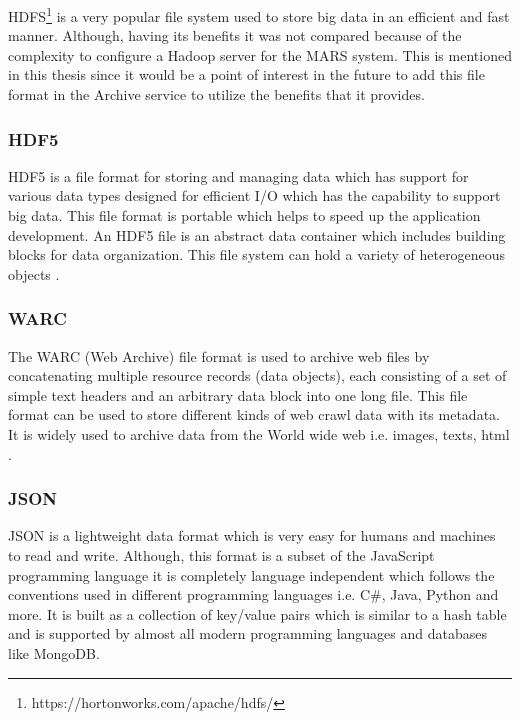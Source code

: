 HDFS\footnote{https://hortonworks.com/apache/hdfs/} is a very popular file system used to store big data in an efficient and fast manner. 
Although, having its benefits it was not compared because of the complexity to configure a Hadoop server for the MARS system. This is mentioned in this thesis since it would be
a point of interest in the future to add this file format in the Archive service to utilize the benefits that it provides.

\subsubsection{HDF5}
HDF5 is a file format for storing and managing data which has support for various data types designed for
efficient I/O which has the capability to support big data. This file format is portable which helps to speed
up the application development. An HDF5 file is an abstract data container which includes building blocks for data organization. This file
system can hold a variety of heterogeneous objects \cite{Savic2007}. 

\subsubsection{WARC}
The WARC (Web Archive) file format is used to archive web files by concatenating multiple resource records
(data objects), each consisting of a set of simple text headers and an arbitrary data block into one long file.
This file format can be used to store different kinds of web crawl data with its metadata. It is widely used
 to archive data from the World wide web i.e. images, texts, html \cite{WARC}.

\subsubsection{JSON} 
JSON is a lightweight data format which is very easy for humans and machines to read and write. Although, this format is a subset of the JavaScript
programming language it is completely language independent which follows the conventions used in different programming languages i.e. C\#, Java, Python and more.
It is built as a collection of key/value pairs which is similar to a hash table and is supported by almost all modern programming languages and databases like
MongoDB.

